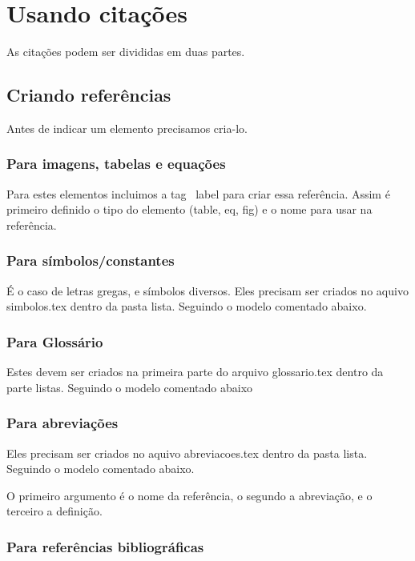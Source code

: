 \section{Usando citações}

As citações podem ser divididas em duas partes. 

\subsection{Criando referências}
Antes de indicar um elemento precisamos cria-lo.

\subsubsection{Para imagens, tabelas e equações}
Para estes elementos incluimos a tag \ label para criar essa referência. Assim é primeiro definido o tipo do elemento (table, eq, fig) e o nome para usar na referência.

\subsubsection{Para símbolos/constantes}
É o caso de letras gregas, e símbolos diversos. Eles precisam ser criados no aquivo simbolos.tex dentro da pasta lista. Seguindo o modelo comentado abaixo.

\subsubsection{Para Glossário}
Estes devem ser criados na primeira parte do arquivo glossario.tex dentro da parte listas. Seguindo o modelo comentado abaixo


\subsubsection{Para abreviações}
Eles precisam ser criados no aquivo abreviacoes.tex dentro da pasta lista. Seguindo o modelo comentado abaixo. 

O primeiro argumento é o nome da referência, o segundo a abreviação, e o terceiro a definição.

\subsubsection{Para referências bibliográficas}

